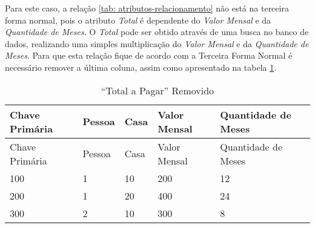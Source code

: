     
Para este caso, a relação \ref{tab: atributos-relacionamento} não está na terceira forma normal, pois o atributo \textit{Total} é dependente do \textit{Valor Mensal} e da \textit{Quantidade de Meses}. O \textit{Total} pode ser obtido através de uma busca no banco de dados, realizando uma simples multiplicação do \textit{Valor Mensal} e da \textit{Quantidade de Meses}. Para que esta relação fique de acordo com a Terceira Forma Normal é necessário remover a última coluna, assim como apresentado na tabela \ref{tab: total-a-pagar-removido}.
    
\begin{longtable}[]{@{}lllll@{}}
\caption{``Total a Pagar'' Removido \label{tab: total-a-pagar-removido}}\tabularnewline
\toprule
Chave Primária & Pessoa & Casa & Valor Mensal & Quantidade de Meses\tabularnewline
\midrule
\endfirsthead
\toprule
Chave Primária & Pessoa & Casa & Valor Mensal & Quantidade de Meses\tabularnewline
\midrule
\endhead
100 & 1 & 10 & 200 & 12\tabularnewline
200 & 1 & 20 & 400 & 24\tabularnewline
300 & 2 & 10 & 300 & 8\tabularnewline
\bottomrule
\end{longtable}

